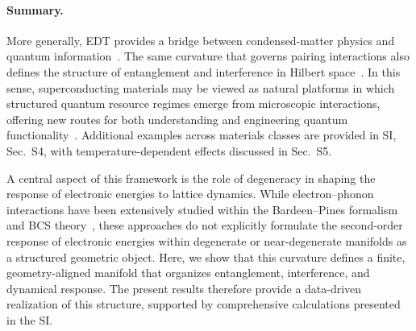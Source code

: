 \documentclass[twocolumn,10pt]{article}
\begin{document}


\paragraph*{Summary.}

More generally, EDT provides a bridge between condensed-matter physics and quantum information~\cite{NielsenChuang,Amico2008}. The same curvature that governs pairing interactions also defines the structure of entanglement and interference in Hilbert space~\cite{Berry1984,Xiao2010}. In this sense, superconducting materials may be viewed as natural platforms in which structured quantum resource regimes emerge from microscopic interactions, offering new routes for both understanding and engineering quantum functionality~\cite{BCS1957,Giustino2017}. Additional examples across materials classes are provided in SI, Sec.~S4, with temperature-dependent effects discussed in Sec.~S5.

A central aspect of this framework is the role of degeneracy in shaping the response of electronic energies to lattice dynamics. While electron--phonon interactions have been extensively studied within the Bardeen--Pines formalism and BCS theory~\cite{BardeenPines1955,BCS1957}, these approaches do not explicitly formulate the second-order response of electronic energies within degenerate or near-degenerate manifolds as a structured geometric object. Here, we show that this curvature defines a finite, geometry-aligned manifold that organizes entanglement, interference, and dynamical response. The present results therefore provide a data-driven realization of this structure, supported by comprehensive calculations presented in the SI.
\end{document}
